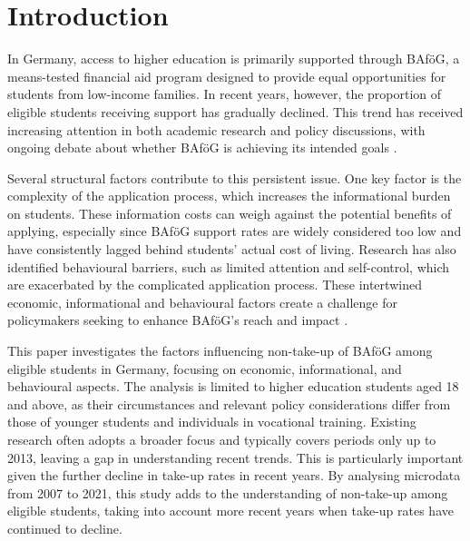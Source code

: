 \section{Introduction} \label{sec:intro}



In Germany, access to higher education is primarily supported through BAföG, a means-tested financial aid program designed to provide equal opportunities for students from low-income families. In recent years, however, the proportion of eligible students receiving support has gradually declined. This trend has received increasing attention in both academic research and policy discussions, with ongoing debate about whether BAföG is achieving its intended goals \citep{gwosc_krisenbewaltigung_2022, meier_bafog_2024}.

Several structural factors contribute to this persistent issue. One key factor is the complexity of the application process, which increases the informational burden on students. These information costs can weigh against the potential benefits of applying, especially since BAföG support rates are widely considered too low and have consistently lagged behind students’ actual cost of living. Research has also identified behavioural barriers, such as limited attention and self-control, which are exacerbated by the complicated application process. These intertwined economic, informational and behavioural factors create a challenge for policymakers seeking to enhance BAföG’s reach and impact \citep{staack_von_2017, bhargava_psychological_2015, bolland_information_nodate}.

This paper investigates the factors influencing non-take-up of BAföG among eligible students in Germany, focusing on economic, informational, and behavioural aspects. The analysis is limited to higher education students aged 18 and above, as their circumstances and relevant policy considerations differ from those of younger students and individuals in vocational training. Existing research often adopts a broader focus and typically covers periods only up to 2013, leaving a gap in understanding recent trends. This is particularly important given the further decline in take-up rates in recent years. By analysing microdata from 2007 to 2021, this study adds to the understanding of non-take-up among eligible students, taking into account more recent years when take-up rates have continued to decline.

